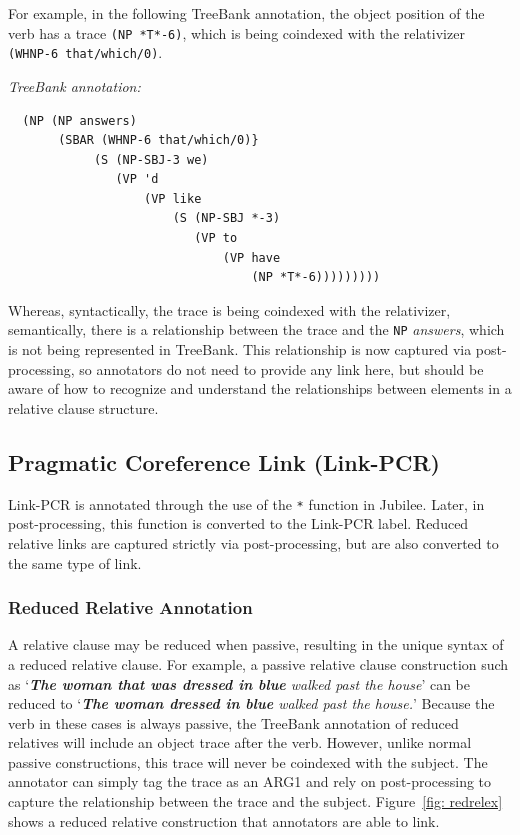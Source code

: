 \documentclass[11pt]{report}
\begin{document}
\noindent For example, in the following TreeBank annotation, the object position of the verb has a trace \texttt{(NP *T*-6)}, which is being coindexed with the relativizer \texttt{(WHNP-6 that/which/0)}. 

\textit{TreeBank annotation:}
\begin{verbatim}
  (NP (NP answers)
       (SBAR (WHNP-6 that/which/0)}
            (S (NP-SBJ-3 we)
               (VP 'd
                   (VP like
                       (S (NP-SBJ *-3)
                          (VP to
                              (VP have
                                  (NP *T*-6)))))))))
\end{verbatim}                                  

Whereas, syntactically, the trace is being coindexed with the relativizer,  semantically, there is a relationship between the trace and the \texttt{NP} \textit{answers}, which is not being represented in TreeBank. This relationship is now captured via post-processing, so annotators do not need to provide any link here, but should be aware of how to recognize and understand the relationships between elements in a relative clause structure. 

\subsection{Pragmatic Coreference Link (Link-PCR)}
Link-PCR is annotated through the use of the \texttt{*}  function in Jubilee.  Later, in post-processing, this function is converted to the Link-PCR label.  Reduced relative links are captured strictly via post-processing, but are also converted to the same type of link. 

\subsubsection{Reduced Relative Annotation}

A relative clause may be reduced when passive, resulting in the unique syntax of a reduced relative clause.  For example, a passive relative clause construction such as `\textit{\textbf{The woman that was dressed in blue} walked past the house}' can be reduced to `\textit{\textbf{The woman dressed in blue} walked past the house.}'  Because the verb in these cases is always passive, the TreeBank annotation of reduced relatives will include an object trace after the verb.  However, unlike normal passive constructions, this trace will never be coindexed with the subject.  The annotator can simply tag the trace as an ARG1 and rely on post-processing to capture the relationship between the trace and the subject. Figure~\ref{fig: redrelex} shows a reduced relative construction that annotators are able to link. 
\end{document}
